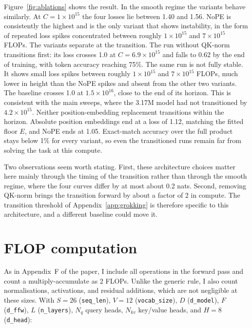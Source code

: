 \documentclass[10pt]{article}
\newcommand{\e}[1]{\times 10^{#1}}
\begin{document}
Figure~\ref{fig:ablations} shows the result. In the smooth regime the
variants behave similarly. At $C = 1\e{15}$ the four losses lie between
1.40 and 1.56. NoPE is consistently the highest and is the only variant
that shows instability, in the form of repeated loss spikes concentrated
between roughly $1\e{15}$ and $7\e{15}$ FLOPs. The variants separate at the
transition. The run without QK-norm transitions first: its loss crosses 1.0
at $C = 6.9\e{15}$ and falls to 0.62 by the end of training, with token
accuracy reaching 75\%. The same run is not fully stable. It shows small
loss spikes between roughly $1\e{15}$ and $7\e{15}$ FLOPs, much lower in
height than the NoPE spikes and absent from the other two variants. The
baseline crosses 1.0 at $1.5\e{16}$, close to
the end of its horizon. This is consistent with the main sweeps, where the
3.17M model had not transitioned by $4.2\e{15}$. Neither position-embedding
replacement transitions within the horizon. Absolute position embeddings
end at a loss of 1.12, matching the fitted floor $E$, and NoPE ends at
1.05. Exact-match accuracy over the full product stays below 1\% for every
variant, so even the transitioned runs remain far from solving the task at
this compute.

Two observations seem worth stating. First, these
architecture choices matter here mainly through the timing of the
transition rather than through the smooth regime, where the four curves
differ by at most about 0.2 nats. Second, removing QK-norm brings the
transition forward by about a factor of 2 in compute. The transition
threshold of Appendix~\ref{app:grokking} is therefore specific to this
architecture, and a different baseline could move it.

\clearpage
\section{FLOP computation}
\label{app:flops}

As in Appendix~F of the paper, I include all operations in the forward pass
and count a multiply-accumulate as 2 FLOPs. Unlike the generic rule, I also
count normalisations, activations, and residual additions, which are not
negligible at these sizes. With $S = 26$ (\texttt{seq\_len}), $V = 12$
(\texttt{vocab\_size}), $D$ (\texttt{d\_model}), $F$ (\texttt{d\_ffw}),
$L$ (\texttt{n\_layers}), $N_q$ query heads, $N_{kv}$ key/value heads, and
$H = 8$ (\texttt{d\_head}):
\end{document}
